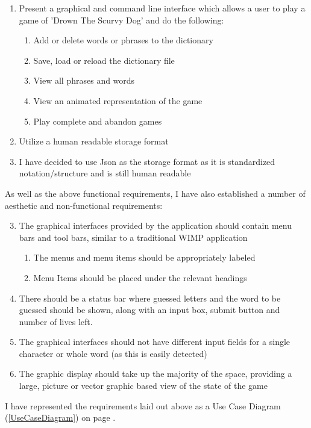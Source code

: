 \documentclass[a4paper, 11pt]{article}
\begin{document}
\begin{enumerate}
\item Present a graphical and command line interface which allows a user to play a game of 'Drown The Scurvy Dog' and do the following:
\begin{enumerate}
\item Add or delete words or phrases to the dictionary
\item Save, load or reload the dictionary file
\item View all phrases and words
\item View an animated representation of the game
\item Play complete and abandon games
\end{enumerate}
\item Utilize a human readable storage format
\item I have decided to use Json as the storage format as it is standardized notation/structure and is still human readable
\end{enumerate}

As well as the above functional requirements, I have also established a number of aesthetic and non-functional requirements:

\begin{enumerate}
\setcounter{enumi}{2}
\item The graphical interfaces provided by the application should contain menu bars and tool bars, similar to a traditional WIMP application
\begin{enumerate}
\item The menus and menu items should be appropriately labeled
\item Menu Items should be placed under the relevant headings
\end{enumerate}
\item There should be a status bar where guessed letters and the word to be guessed should be shown, along with an input box, submit button and number of lives left.
\item The graphical interfaces should not have different input fields for a single character or whole word (as this is easily detected)
\item The graphic display should take up the majority of the space, providing a large, picture or vector graphic based view of the state of the game
\end{enumerate}

I have represented the requirements laid out above as a Use Case Diagram (\ref{UseCaseDiagram}) on page \pageref{UseCaseDiagram}.
\end{document}

